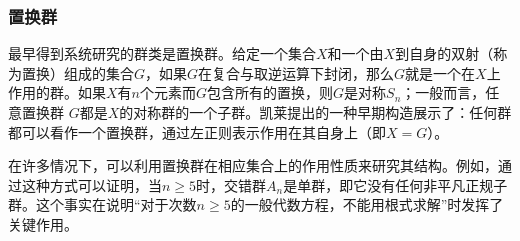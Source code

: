 \subsubsection{置换群}
最早得到系统研究的群类是置换群。给定一个集合$X$和一个由$X$到自身的双射（称为置换）组成的集合$G$，如果$G$在复合与取逆运算下封闭，那么$G$就是一个在$X$上作用的群。如果$X$有$n$个元素而$G$包含所有的置换，则$G$是对称$S_n$；一般而言，任意置换群 $G$都是$X$的对称群的一个子群。凯莱提出的一种早期构造展示了：任何群都可以看作一个置换群，通过左正则表示作用在其自身上（即$X = G$）。

在许多情况下，可以利用置换群在相应集合上的作用性质来研究其结构。例如，通过这种方式可以证明，当$n \geq 5$时，交错群$A_n$是单群，即它没有任何非平凡正规子群。这个事实在说明“对于次数$n \geq 5$的一般代数方程，不能用根式求解”时发挥了关键作用。

